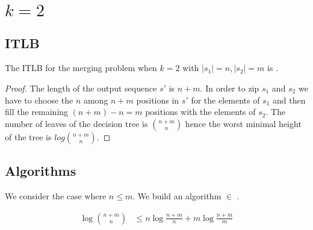 \section{$k=2$}
\label{tree:merging:k=2}

\subsection{ITLB}
\label{tree:merging:k=2:ITLB}


\begin{theorem}
The ITLB for the merging problem when $k = 2$ with $|s_1| = n, |s_2| = m$ is .
\end{theorem}

\begin{proof}
The length of the output sequence $s'$ is $n+m$. In order to zip $s_1$ and $s_2$ we have to choose the $n$ among $n+m$ positions in $s'$ for the elements of $s_1$ and then fill the remaining $(n+m) - n = m$ positions with the elements of $s_2$. The number of leaves of the decision tree is $\binom{n+m}{n}$ hence the worst minimal height of the tree is $log \binom{n+m}{n}$.
\end{proof}



\subsection{Algorithms}
\label{tree:merging:k=2:alg}

We consider the case where $n \leq m$. We build an algorithm $\in$ .

\begin{lemma}
\begin{align*}
\log\binom{n+m}{n} &\leq n \log\frac{n+m}{n} + m \log\frac{n+m}{m}\\
\end{align*}
\end{lemma}

